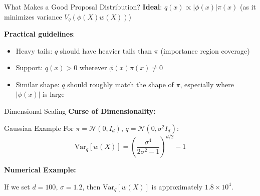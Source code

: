 \begin{frame}{What Makes a Good Proposal Distribution?}
	\textbf{Ideal}: $q(x) \propto |\phi(x)| \pi(x)$ (as it minimizes variance $V_q(\phi(X) w(X))$)

	\vspace{0.3cm}
	\textbf{Practical guidelines}:
	\begin{itemize}
		\item Heavy tails: $q$ should have heavier tails than $\pi$ (importance region coverage)
		\item Support: $q(x) > 0$ wherever $\phi(x)\pi(x) \neq 0$
		\item Similar shape: $q$ should roughly match the shape of $\pi$, especially where $|\phi(x)|$ is large
	\end{itemize}
\end{frame}

\begin{frame}{Dimensional Scaling}
	\textbf{Curse of Dimensionality:}
	\begin{block}{Gaussian Example}
		For $\pi = \mathcal{N}(0,I_d)$, $q = \mathcal{N}(0,\sigma^2 I_d)$:
		$$\text{Var}_q[w(X)] = \left(\frac{\sigma^4}{2\sigma^2-1}\right)^{d/2} - 1$$
	\end{block}

	\textbf{Numerical Example:}
	
	\vspace{0.3cm}
	If we set
	$d = 100$, $\sigma = 1.2$, then $\text{Var}_q[w(X)]$ is approximately $1.8 \times 10^4$.
\end{frame}
